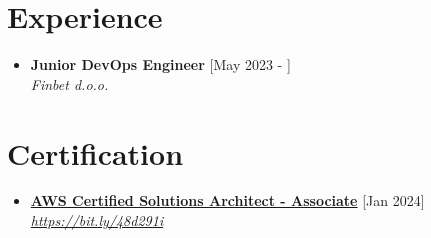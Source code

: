 \documentclass[a4paper]{moderncv}
\begin{document}
\makecvtitle



\section{Experience}

\begin{itemize}
	\item \textbf{Junior DevOps Engineer} \hfill [May 2023 - ]\\
	\textit{Finbet d.o.o.}
\end{itemize}	

\section{Certification}

\begin{itemize}
	\item \textbf{\href{https://aws.amazon.com/certification/certified-solutions-architect-associate/}{AWS Certified Solutions Architect - Associate}} \hfill [Jan 2024]\\
	\textit{\href{https://cp.certmetrics.com/amazon/en/public/verify/credential/c546a05a82c243b895493ff0316a1e67}{https://bit.ly/48d291i}}				
	
	


	
\end{itemize}
\end{document}
